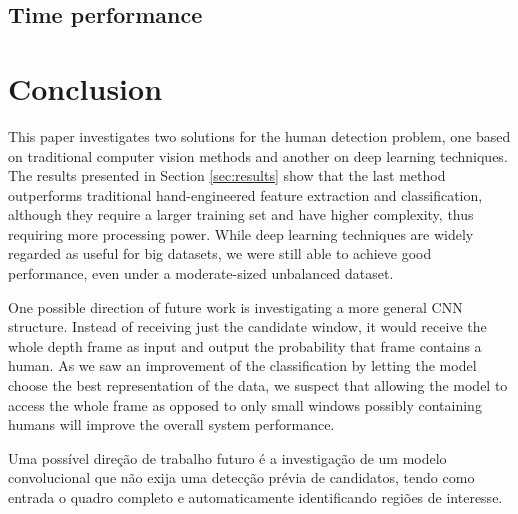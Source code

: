     \subsection{Time performance}

\section{Conclusion}
\label{sec:conclusion}
    This paper investigates two solutions for the human detection problem, one based on traditional computer vision methods and another on deep learning techniques. The results presented in Section \ref{sec:results} show that the last method outperforms traditional hand-engineered feature extraction and classification, although they require a larger training set and have higher complexity, thus requiring more processing power. While deep learning techniques are widely regarded as useful for big datasets, we were still able to achieve good performance, even under a moderate-sized unbalanced dataset.

    One possible direction of future work is investigating a more general CNN structure. Instead of receiving just the candidate window, it would receive the whole depth frame as input and output the probability that frame contains a human. As we saw an improvement of the classification by letting the model choose the best representation of the data, we suspect that allowing the model to access the whole frame as opposed to only small windows possibly containing humans will improve the overall system performance.

    Uma possível direção de trabalho futuro é a investigação de um modelo convolucional que não exija uma detecção prévia de candidatos, tendo como entrada o quadro completo e automaticamente identificando regiões de interesse.
